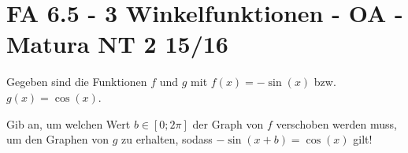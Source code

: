 \section{FA 6.5 - 3 Winkelfunktionen - OA - Matura NT 2 15/16}

\begin{beispiel}[FA 6.5]{1} %
Gegeben sind die Funktionen $f$ und $g$ mit $f(x)=-\sin(x)$ bzw. $g(x)=\cos(x)$.

Gib an, um welchen Wert $b\in\left[0;2\pi\right]$ der Graph von $f$ verschoben werden muss, um den Graphen von $g$ zu erhalten, sodass $-\sin(x+b)=\cos(x)$ gilt!

\end{beispiel}